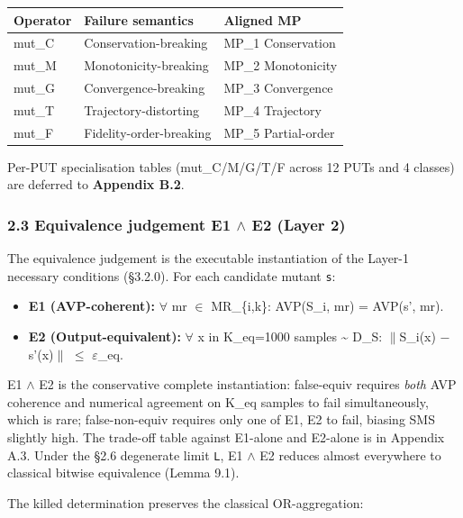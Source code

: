 \documentclass[review,12pt,authoryear]{elsarticle}
\providecommand{\tightlist}{\setlength{\itemsep}{0pt}\setlength{\parskip}{0pt}}
\newcounter{none}                   %
\begin{document}
{\def\LTcaptype{none} %
\begin{longtable}[]{@{}lll@{}}
\toprule\noalign{}
Operator & Failure semantics & Aligned MP \\
\midrule\noalign{}
\endhead
\bottomrule\noalign{}
\endlastfoot
mut\_C & Conservation-breaking & MP\_1 Conservation \\
mut\_M & Monotonicity-breaking & MP\_2 Monotonicity \\
mut\_G & Convergence-breaking & MP\_3 Convergence \\
mut\_T & Trajectory-distorting & MP\_4 Trajectory \\
mut\_F & Fidelity-order-breaking & MP\_5 Partial-order \\
\end{longtable}
}

Per-PUT specialisation tables (mut\_C/M/G/T/F across 12 PUTs and 4
classes) are deferred to \textbf{Appendix B.2}.

\subsubsection{2.3 Equivalence judgement E1 $\wedge$ E2 (Layer
2)}\label{equivalence-judgement-e1-e2-layer-2}

The equivalence judgement is the executable instantiation of the Layer-1
necessary conditions (§3.2.0). For each candidate mutant
\texttt{s\textquotesingle{}}:

\begin{itemize}
\tightlist
\item
  \textbf{E1 (AVP-coherent):} $\forall$ mr $\in$ MR\_\{i,k\}: AVP(S\_i, mr) =
  AVP(s', mr).
\item
  \textbf{E2 (Output-equivalent):} $\forall$ x in K\_eq=1000 samples
  \textasciitilde{} D\_S: $\|$S\_i(x) − s'(x)$\|$ $\leq$ $\varepsilon$\_eq.
\end{itemize}

E1 $\wedge$ E2 is the conservative complete instantiation: false-equiv requires
\emph{both} AVP coherence and numerical agreement on K\_eq samples to
fail simultaneously, which is rare; false-non-equiv requires only one of
E1, E2 to fail, biasing SMS slightly high. The trade-off table against
E1-alone and E2-alone is in Appendix A.3. Under the §2.6 degenerate
limit \texttt{L}, E1 $\wedge$ E2 reduces almost everywhere to classical bitwise
equivalence (Lemma 9.1).

The killed determination preserves the classical OR-aggregation:
\end{document}
